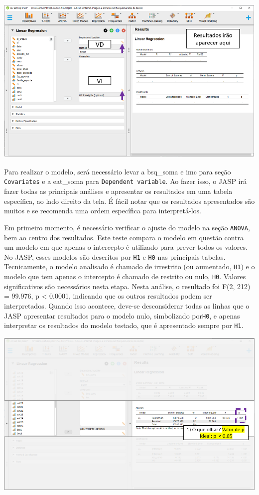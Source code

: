 \documentclass[
]{book}
\begin{document}
\includegraphics{./img/cap_reg_interface.png}

Para realizar o modelo, será necessário levar a bsq\_soma e imc para
seção \texttt{Covariates} e a eat\_soma para
\texttt{Dependent\ variable}. Ao fazer isso, o JASP irá fazer todas as
principais análises e apresentar os resultados em uma tabela específica,
ao lado direito da tela. É fácil notar que os resultados apresentados
são muitos e se recomenda uma ordem específica para interpretá-los.

Em primeiro momento, é necessário verificar o ajuste do modelo na seção
\texttt{ANOVA}, bem ao centro dos resultados. Este teste compara o
modelo em questão contra um modelo em que apenas o intercepto é
utilizado para prever todos os valores. No JASP, esses modelos são
descritos por \texttt{H1} e \texttt{H0} nas principais tabelas.
Tecnicamente, o modelo analisado é chamado de irrestrito (ou aumentado,
\texttt{H1}) e o modelo que tem apenas o intercepto é chamado de
restrito ou nulo, \texttt{H0}. Valores significativos são necessários
nesta etapa. Nesta análise, o resultado foi F(2, 212) = 99.976, p
\textless{} 0.0001, indicando que os outros resultados podem ser
interpretados. Quando isso acontece, deve-se desconsiderar todas as
linhas que o JASP apresentar resultados para o modelo nulo, simbolizado
por\texttt{H0}, e apenas interpretar os resultados do modelo testado,
que é apresentado sempre por \texttt{H1}.

\includegraphics{./img/cap_reg_multipla_resultado_1.png}
\end{document}
